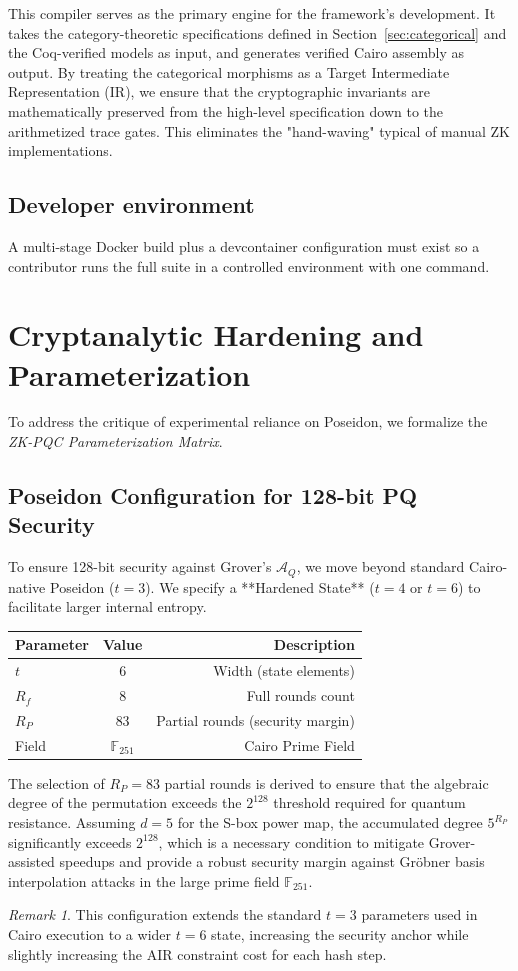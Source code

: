 \documentclass[conference]{IEEEtran}
\theoremstyle{definition}
\theoremstyle{plain}
\theoremstyle{remark}
\newtheorem{remark}{Remark}
\newcommand{\F}{\mathbb{F}}
\begin{document}
This compiler serves as the primary engine for the framework's development. It takes the category-theoretic specifications defined in Section~\ref{sec:categorical} and the Coq-verified models as input, and generates verified Cairo assembly as output. By treating the categorical morphisms as a Target Intermediate Representation (IR), we ensure that the cryptographic invariants are mathematically preserved from the high-level specification down to the arithmetized trace gates. This eliminates the "hand-waving" typical of manual ZK implementations.

\subsection*{Developer environment}
A multi-stage Docker build plus a devcontainer configuration must exist so a contributor runs the full suite in a controlled environment with one command.

\section{Cryptanalytic Hardening and Parameterization}
To address the critique of experimental reliance on Poseidon, we formalize the \textit{ZK-PQC Parameterization Matrix}.

\subsection{Poseidon Configuration for 128-bit PQ Security}
To ensure 128-bit security against Grover's $\mathcal{A}_Q$, we move beyond standard Cairo-native Poseidon ($t=3$). We specify a **Hardened State** ($t=4$ or $t=6$) to facilitate larger internal entropy.
\begin{center}
\begin{tabular}{|l|c|r|}
\hline
Parameter & Value & Description \\ \hline
$t$ & 6 & Width (state elements) \\
$R_f$ & 8 & Full rounds count \\
$R_P$ & 83 & Partial rounds (security margin) \\
Field & $\F_{251}$ & Cairo Prime Field \\
\hline
\end{tabular}
\end{center}
The selection of $R_P = 83$ partial rounds is derived to ensure that the algebraic degree of the permutation exceeds the $2^{128}$ threshold required for quantum resistance. Assuming $d=5$ for the S-box power map, the accumulated degree $5^{R_P}$ significantly exceeds $2^{128}$, which is a necessary condition to mitigate Grover-assisted speedups and provide a robust security margin against Gröbner basis interpolation attacks in the large prime field $\F_{251}$.
\begin{remark}
This configuration extends the standard $t=3$ parameters used in Cairo execution to a wider $t=6$ state, increasing the security anchor while slightly increasing the AIR constraint cost for each hash step.
\end{remark}
\end{document}
